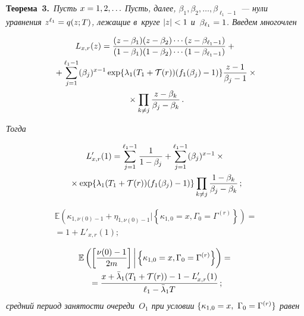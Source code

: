 \begin{multicols}{2}
\noindent
\textbf{Теорема~3.}\
\textit{Пусть $x\hm=1, 2, \ldots$ Пусть, далее, $\beta_1, \beta_2, \ldots,
\beta_{\ell_1-1}$~--- нули уравнения $z^{\ell_1}\hm=q(z;T)$, лежащие в~круге
  $|z|\hm<1$ и~$\beta_{\ell_1}\hm=1$.  Введем многочлен}
  
  \vspace*{-6pt}
  
  \noindent
  \begin{multline*}
    L_{x,r}(z)=\displaystyle\frac{\displaystyle (z-\beta_{1})(z-\beta_2)\cdots(z-\beta_{\ell_1-1})\mathstrut}{\displaystyle (1-\beta_{1})(1-\beta_2)\cdots(1-\beta_{\ell_1-1})\mathstrut}+{}\\
{}    +\sum\limits_{j=1}^{\ell_1-1}(\beta_{j})^{x-1}
    \exp\{\lambda_{1}(T_{1}+\mathcal{T}(r))(f_{1}(\beta_{j})-1)\}
    \displaystyle\frac{\displaystyle z-1\mathstrut}{\displaystyle \beta_{j}-1\mathstrut}\times{}\\
    {}\times \prod\limits_{k\neq j}\displaystyle\frac{\displaystyle z-\beta_{k}\mathstrut}{\displaystyle \beta_{j}-\beta_{k}\mathstrut}\,.
\end{multline*}

\vspace*{-7pt}

\noindent
\textit{Тогда}

\vspace*{-6pt}

\noindent
\begin{multline*}
    L'_{x,r}(1) =\sum\limits_{j=1}^{\ell_1-1} \displaystyle\frac{\displaystyle 1\mathstrut}{\displaystyle 1-\beta_{j}\mathstrut} +
    \sum\limits_{j=1}^{\ell_1-1}(\beta_{j})^{x-1}\times{}\\
    {}\times
    \exp\{\lambda_{1}(T_{1}+\mathcal T(r))(f_{1}(\beta_{j})-1)\} 
    \prod\limits_{k\neq j}\displaystyle\frac{\displaystyle 1-\beta_{k}\mathstrut}{\displaystyle \beta_{j}-\beta_{k}\mathstrut}\,;
    \end{multline*}
    
\vspace*{-12pt}

    \noindent
    \begin{multline}
  \mathbb E\left( \kappa_{1,\nu(0)-1}+\eta_{1,\nu(0)-1} \Big\vert
  \left\{\kappa_{1,0}=x,\Gamma_{0}=\Gamma^{(r)}\right\}\right)={}\\
  {}=1+L'_{x,r}(1);
   \label{AZ:eq:E-nu0-1}
   \end{multline}
   
  \vspace*{-12pt}

    \noindent
    \begin{multline*}
  \mathbb{E}\left(\left[\displaystyle\frac{\displaystyle \nu(0)-
1\mathstrut}{\displaystyle 2m\mathstrut}\right]\bigg|\left\{\kappa_{1,0}=x,\Gamma_{0}=\Gamma^{(r)}\right\}\right)={}\\
{}=
  \displaystyle\frac{\displaystyle x+\bar\lambda_1(T_1+\mathcal T(r))-1-L'_{x,r}(1)\mathstrut}{\displaystyle \ell_1-\bar\lambda_1 T\mathstrut}\,;
\end{multline*}
\textit{средний период занятости очереди~$O_1$ при условии
$\{\kappa_{1,0}\hm=x,\ \Gamma_0\hm =\Gamma^{(r)}\}$ равен}


\end{multicols}

